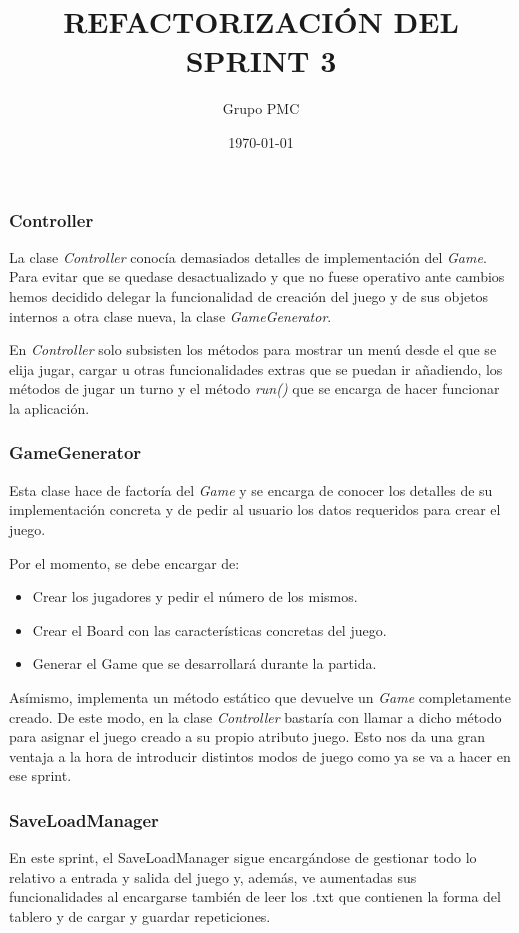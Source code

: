 \documentclass{article}
\title{REFACTORIZACIÓN DEL SPRINT 3}
\date{\today}
\author{Grupo PMC}
\begin{document}
\maketitle

\subsubsection*{Controller}
La clase \textit{Controller} conocía demasiados detalles de implementación del \textit{Game}. Para evitar que se quedase desactualizado y que no fuese operativo ante cambios hemos decidido delegar la funcionalidad de creación del juego y de sus objetos internos a otra clase nueva, la clase \textit{GameGenerator}.

En \textit{Controller} solo subsisten los métodos para mostrar un menú desde el que se elija jugar, cargar u otras funcionalidades extras que se puedan ir añadiendo, los métodos de jugar un turno y el método \textit{run()} que se encarga de hacer funcionar la aplicación.

\subsubsection*{GameGenerator}
Esta clase hace de factoría del \textit{Game} y se encarga de conocer los detalles de su implementación concreta y de pedir al usuario los datos requeridos para crear el juego.

Por el momento, se debe encargar de:
\begin{itemize}
\item Crear los jugadores y pedir el número de los mismos.
\item Crear el Board con las características concretas del juego.
\item Generar el Game que se desarrollará durante la partida.
\end{itemize}

Asímismo, implementa un método estático que devuelve un \textit{Game} completamente creado. De este modo, en la clase \textit{Controller} bastaría con llamar a dicho método para asignar el juego creado a su propio atributo juego. Esto nos da una gran ventaja a la hora de introducir distintos modos de juego como ya se va a hacer en ese sprint.

\subsubsection*{SaveLoadManager}
En este sprint, el SaveLoadManager sigue encargándose de gestionar todo lo relativo a entrada y salida del juego y, además, ve aumentadas sus funcionalidades al encargarse también de leer los .txt que contienen la forma del tablero y de cargar y guardar repeticiones.
\end{document}
